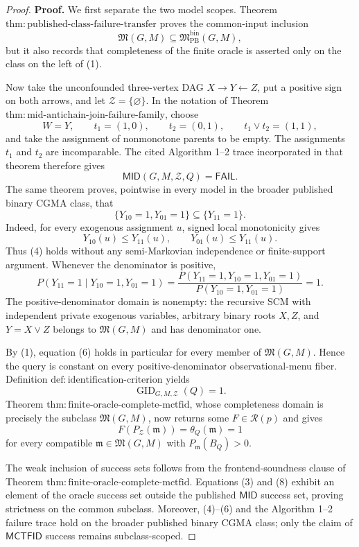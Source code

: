 \documentclass{article}
\begin{document}
\begin{proof}
\textbf{Proof.}
We first separate the two model scopes.  Theorem \(\mathrm{thm:published\text{-}class\text{-}failure\text{-}transfer}\) proves the common-input inclusion
\[
 \mathfrak M(G,M)\subseteq
 \mathfrak M_{\mathrm{PB}}^{\mathrm{bin}}(G,M),
\tag{1}
\]
but it also records that completeness of the finite oracle is asserted only on the class on the left of (1).

Now take the unconfounded three-vertex DAG \(X\to Y\leftarrow Z\), put a positive sign on both arrows, and let \(\mathcal Z=\{\varnothing\}\).  In the notation of Theorem \(\mathrm{thm:mid\text{-}antichain\text{-}join\text{-}failure\text{-}family}\), choose
\[
 W=Y,
 \qquad
 t_1=(1,0),
 \qquad
 t_2=(0,1),
 \qquad
 t_1\vee t_2=(1,1),
\tag{2}
\]
and take the assignment of nonmonotone parents to be empty.  The assignments \(t_1\) and \(t_2\) are incomparable.  The cited Algorithm 1--2 trace incorporated in that theorem therefore gives
\[
 \mathsf{MID}(G,M,\mathcal Z,Q)=\mathsf{FAIL}.
\tag{3}
\]
The same theorem proves, pointwise in every model in the broader published binary CGMA class, that
\[
 \{Y_{10}=1,Y_{01}=1\}
 \subseteq
 \{Y_{11}=1\}.
\tag{4}
\]
Indeed, for every exogenous assignment \(u\), signed local monotonicity gives
\[
 Y_{10}(u)\le Y_{11}(u),
 \qquad
 Y_{01}(u)\le Y_{11}(u).
\tag{5}
\]
Thus (4) holds without any semi-Markovian independence or finite-support argument.  Whenever the denominator is positive,
\[
 P(Y_{11}=1\mid Y_{10}=1,Y_{01}=1)
 =\frac{P(Y_{11}=1,Y_{10}=1,Y_{01}=1)}
 {P(Y_{10}=1,Y_{01}=1)}
 =1.
\tag{6}
\]
The positive-denominator domain is nonempty: the recursive SCM with independent private exogenous variables, arbitrary binary roots \(X,Z\), and \(Y=X\lor Z\) belongs to \(\mathfrak M(G,M)\) and has denominator one.

By (1), equation (6) holds in particular for every member of \(\mathfrak M(G,M)\).  Hence the query is constant on every positive-denominator observational-menu fiber.  Definition \(\mathrm{def:identification\text{-}criterion}\) yields
\[
 \operatorname{GID}_{G,M,\mathcal Z}(Q)=1.
\tag{7}
\]
Theorem \(\mathrm{thm:finite\text{-}oracle\text{-}complete\text{-}mctfid}\), whose completeness domain is precisely the subclass \(\mathfrak M(G,M)\), now returns some \(F\in\mathcal R(p)\) and gives
\[
 F(P_{\mathcal Z}(\mathfrak m))
 =\theta_Q(\mathfrak m)
 =1
\tag{8}
\]
for every compatible \(\mathfrak m\in\mathfrak M(G,M)\) with \(P_{\mathfrak m}(B_Q)>0\).

The weak inclusion of success sets follows from the frontend-soundness clause of Theorem \(\mathrm{thm:finite\text{-}oracle\text{-}complete\text{-}mctfid}\).  Equations (3) and (8) exhibit an element of the oracle success set outside the published \(\mathsf{MID}\) success set, proving strictness on the common subclass.  Moreover, (4)--(6) and the Algorithm 1--2 failure trace hold on the broader published binary CGMA class; only the claim of \(\mathsf{MCTFID}\) success remains subclass-scoped.


\end{proof}
\end{document}
